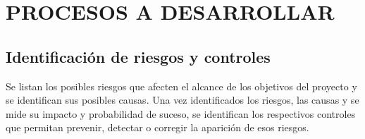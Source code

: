 \chapter{PROCESOS A DESARROLLAR}
%
\section{Identificaci\'on de riesgos y controles}
Se listan los posibles riesgos que afecten el alcance de los objetivos del proyecto y se identifican sus
posibles causas. Una vez identificados los riesgos, las causas y se mide su impacto y probabilidad de suceso,
se identifican los respectivos controles que permitan prevenir, detectar o corregir la aparici\'on de esos
riesgos.